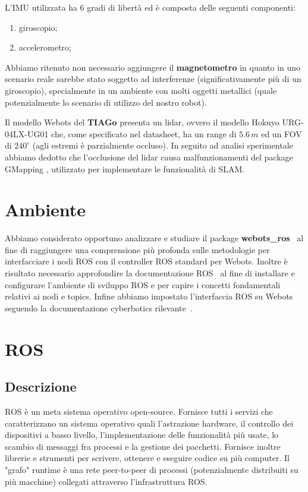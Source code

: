 \documentclass[a4paper]{article}
\begin{document}
    L'IMU utilizzata ha 6 gradi di libertà ed è composta delle seguenti componenti:
	\begin{enumerate}
		\item giroscopio;	
		\item accelerometro;
	\end{enumerate}
	Abbiamo ritenuto non necessario aggiungere il \textbf{magnetometro} in quanto in uno scenario reale sarebbe stato soggetto ad interferenze (significativamente più di un giroscopio), specialmente in un ambiente con molti oggetti metallici (quale potenzialmente lo scenario di utilizzo del nostro robot).
	
	Il modello Webots del \textbf{TIAGo} presenta un lidar, ovvero il modello Hokuyo URG-04LX-UG01 \cite{lidarspecs} che, come specificato nel datasheet,  ha un range di $5.6\,m$ ed un FOV di $240^{\circ}$ (agli estremi è parzialmente occluso). In seguito ad analisi sperimentale abbiamo dedotto che l'occlusione del lidar causa malfunzionamenti del package GMapping \cite{grisettiyz2005improving}, utilizzato per implementare le funzionalità di SLAM.

	\section{Ambiente}\label{sec:Ambiente} 

	Abbiamo considerato opportuno analizzare e studiare il package
	\textbf{webots\_ros}~\cite{cyberbotics} al fine di raggiungere una
	comprensione più profonda sulle metodologie per interfacciare i nodi ROS
	con il controller ROS standard per Webots. Inoltre è risultato necessario
	approfondire la documentazione ROS~\cite{ros.org} al fine di installare e
	configurare l'ambiente di sviluppo ROS e per capire i concetti fondamentali
	relativi ai nodi e topics. Infine abbiamo impostato l'interfaccia ROS su
	Webots seguendo la documentazione cyberbotics
	rilevante~\cite{webotsRosSetup}.  

	\section{ROS}\label{sec:Ros}
	\subsection{Descrizione}\label{subsec:Descrizione}
	ROS \cite{ros.org} è un meta sistema operativo open-source. Fornisce tutti
	i servizi che caratterizzano un sistema operativo quali l'astrazione
	hardware, il controllo dei dispositivi a basso livello,
	l'implementazione delle funzionalità più usate, lo scambio di messaggi fra
	processi e la gestione dei pacchetti. Fornisce inoltre librerie e strumenti
	per scrivere, ottenere e eseguire codice su più computer. Il "grafo"
	runtime è una rete peer-to-peer di processi (potenzialmente distribuiti su
	più macchine) collegati attraverso l'infrastruttura ROS. 
	
\end{document}
